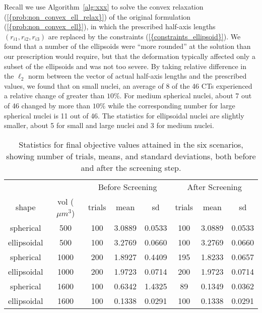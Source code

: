 \documentclass{siamltex}
\begin{document}
Recall we use Algorithm~\ref{alg:xxx} to solve the convex relaxation
{(\ref{{prob:non_convex_ell_relax}})} of the original formulation
{(\ref{{prob:non_convex_ell}})}, in which the prescribed half-axis lengths
$(r_{i1},r_{i2},r_{i3})$ are replaced by the constraints
{(\ref{{constraints_ellipsoid}})}. We found that a number of the
ellipsoids were ``more rounded'' at the solution than our prescription
would require, but that the deformation typically affected only a
subset of the ellipsoids and was not too severe. By taking relative
difference in the $\ell_2$ norm between the vector of actual half-axis
lengths and the prescribed values, we found that on small nuclei, an
average of 8 of the 46 CTs experienced a relative change of
greater than $10\%$. For medium spherical nuclei, about 7 out of 46
changed by more than $10\%$ while the corresponding number for large
spherical nuclei is 11 out of 46. The statistics for ellipsoidal
nuclei are slightly smaller, about 5 for small and large nuclei and 3
for medium nuclei.

\begin{table}
\centering
\caption{Statistics for final objective values attained in the six scenarios, showing number of trials, means, and standard deviations, both before and after the screening step.\label{ta:objectives:0}}
\begin{tabular}{cc|ccc|ccc}
&& \multicolumn{3}{c|}{Before Screening} &
\multicolumn{3}{c}{After Screening} \\ 
shape & vol ($\mu m^3$) & trials & mean & sd & trials 
& mean & sd \\ \hline
spherical &    500 &  100 &  3.0889 & 0.0533 &  100 &  3.0889 & 0.0533 \\
ellipsoidal &    500 &  100 &  3.2769 & 0.0660 &  100 &  3.2769 & 0.0660 \\
spherical &   1000 &  200 &  1.8927 & 0.4409 &  195 &  1.8233 & 0.0657 \\
ellipsoidal &   1000 &  200 &  1.9723 & 0.0714 &  200 &  1.9723 & 0.0714 \\
spherical &   1600 &  100 &  0.6342 & 1.4325 &   89 &  0.1349 & 0.0362 \\
ellipsoidal &   1600 &  100 &  0.1338 & 0.0291 &  100 &  0.1338 & 0.0291 \\
\end{tabular}
\end{table}
\end{document}
